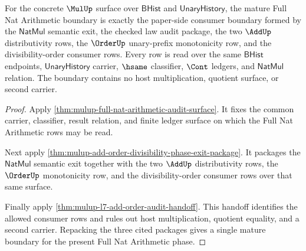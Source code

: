 \begin{theorem}
\label{thm:mulup-full-nat-arithmetic-mature-boundary}
For the concrete $\MulUp$ surface over $\mathsf{BHist}$ and
$\mathsf{UnaryHistory}$, the mature Full Nat Arithmetic boundary is exactly the
paper-side consumer boundary formed by the $\mathsf{NatMul}$ semantic exit, the
checked law audit package, the two $\AddUp$ distributivity rows, the
$\OrderUp$ unary-prefix monotonicity row, and the divisibility-order consumer
rows. Every row is read over the same $\mathsf{BHist}$ endpoints,
$\mathsf{UnaryHistory}$ carrier, $\hsame$ classifier, $\Cont$ ledgers, and
$\mathsf{NatMul}$ relation. The boundary contains no host multiplication,
quotient surface, or second carrier.
\end{theorem}
\begin{proof}
Apply \autoref{thm:mulup-full-nat-arithmetic-audit-surface}. It fixes the
common carrier, classifier, result relation, and finite ledger surface on which
the Full Nat Arithmetic rows may be read.

Next apply \autoref{thm:mulup-add-order-divisibility-phase-exit-package}. It
packages the $\mathsf{NatMul}$ semantic exit together with the two $\AddUp$
distributivity rows, the $\OrderUp$ monotonicity row, and the divisibility-order
consumer rows over that same surface.

Finally apply \autoref{thm:mulup-l7-add-order-audit-handoff}. This handoff
identifies the allowed consumer rows and rules out host multiplication, quotient
equality, and a second carrier. Repacking the three cited packages gives a
single mature boundary for the present Full Nat Arithmetic phase.
\end{proof}
